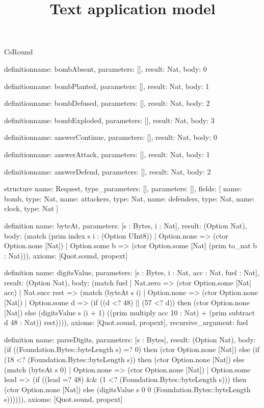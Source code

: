 \begin{lexlean}{CsRound}
\title{Text application model}
\begin{semanticmodule}
definition{name: bombAbsent, parameters: [], result: Nat, body: 0}

definition{name: bombPlanted, parameters: [], result: Nat, body: 1}

definition{name: bombDefused, parameters: [], result: Nat, body: 2}

definition{name: bombExploded, parameters: [], result: Nat, body: 3}

definition{name: answerContinue, parameters: [], result: Nat, body: 0}

definition{name: answerAttack, parameters: [], result: Nat, body: 1}

definition{name: answerDefend, parameters: [], result: Nat, body: 2}

structure{
  name: Request,
  type_parameters: [],
  parameters: [],
  fields: [
    {name: bomb, type: Nat},
    {name: attackers, type: Nat},
    {name: defenders, type: Nat},
    {name: clock, type: Nat}
  ]
}

definition{
  name: byteAt,
  parameters: [s : Bytes, i : Nat],
  result: (Option Nat),
  body: (match (prim index s i : (Option UInt8))
    | Option.none => (ctor Option.none [Nat])
    | Option.some b => (ctor Option.some [Nat] (prim to_nat b : Nat))),
  axioms: [Quot.sound, propext]
}

definition{
  name: digitsValue,
  parameters: [s : Bytes, i : Nat, acc : Nat, fuel : Nat],
  result: (Option Nat),
  body: (match fuel
    | Nat.zero => (ctor Option.some [Nat] acc)
    | Nat.succ rest => (match (byteAt s i)
      | Option.none => (ctor Option.none [Nat])
      | Option.some d => (if ((d <? 48) || (57 <? d)) then (ctor Option.none [Nat]) else (digitsValue s (i + 1) ((prim multiply acc 10 : Nat) + (prim subtract d 48 : Nat)) rest)))),
  axioms: [Quot.sound, propext],
  recursive_argument: fuel
}

definition{
  name: parseDigits,
  parameters: [s : Bytes],
  result: (Option Nat),
  body: (if ((Foundation.Bytes::byteLength s) =? 0) then (ctor Option.none [Nat]) else (if (18 <? (Foundation.Bytes::byteLength s)) then (ctor Option.none [Nat]) else (match (byteAt s 0)
    | Option.none => (ctor Option.none [Nat])
    | Option.some lead => (if ((lead =? 48) && (1 <? (Foundation.Bytes::byteLength s))) then (ctor Option.none [Nat]) else (digitsValue s 0 0 (Foundation.Bytes::byteLength s)))))),
  axioms: [Quot.sound, propext]
}


\end{semanticmodule}
\end{lexlean}

